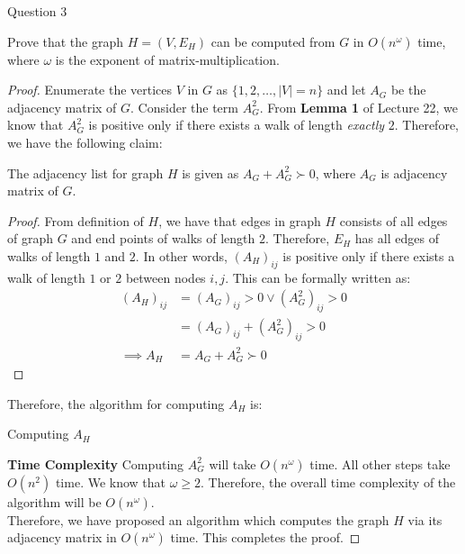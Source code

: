 \begin{solution}{Question 3}\label{ques:3}
    \begin{question}
        Prove that the graph $H = (V, E_H)$ can be computed from $G$ in $O(n^\omega)$ time, where $\omega$ is the exponent of matrix-multiplication.
    \end{question}
    \tcblower{}
    \begin{proof}[Proof]
      Enumerate the vertices $V$ in $G$ as $\{1, 2, \ldots, |V| = n\}$ and let $A_G$ be the adjacency matrix of $G$. Consider the term $A_G^2$. From \textbf{Lemma 1} of Lecture 22, we know that $A_G^2$ is positive only if there exists a walk of length \textit{exactly} $2$. Therefore, we have the following claim:
      \begin{claim}
        The adjacency list for graph $H$ is given as $A_G+A_G^2 \succ 0$, where $A_G$ is adjacency matrix of $G$.
      \end{claim}
      \begin{proof}
        From definition of $H$, we have that edges in graph $H$ consists of all edges of graph $G$ and end points of walks of length $2$. Therefore, $E_H$ has all edges of walks of length $1$ and $2$. In other words, ${(A_H)}_{ij}$ is positive only if there exists a walk of length $1$ or $2$ between nodes $i, j$. This can be formally written as:
        \begin{equation}
          \begin{split}
            {(A_H)}_{ij} &= {(A_G)}_{ij} > 0 \vee {(A_G^2)}_{ij} > 0\\
                         &= {(A_G)}_{ij} + {(A_G^2)}_{ij} > 0\\
            \implies A_H &= A_G+A_G^2 \succ 0
          \end{split}
        \end{equation}
      \end{proof}
      Therefore, the algorithm for computing $A_H$ is:
      \begin{algorithm}[H]
        \caption{Computing $A_H$}
        \begin{algorithmic}[1]
              \Else{}
              \EndIf{}
            \EndFor{}
          \EndProcedure{}
        \end{algorithmic}
      \end{algorithm}
      \textbf{Time Complexity} Computing $A_G^2$ will take $O(n^\omega)$ time. All other steps take $O(n^2)$ time. We know that $\omega \geq 2$. Therefore, the overall time complexity of the algorithm will be $O(n^\omega)$.\\
      Therefore, we have proposed an algorithm which computes the graph $H$ via its adjacency matrix in $O(n^\omega)$ time. This completes the proof.
    \end{proof}
\end{solution}
